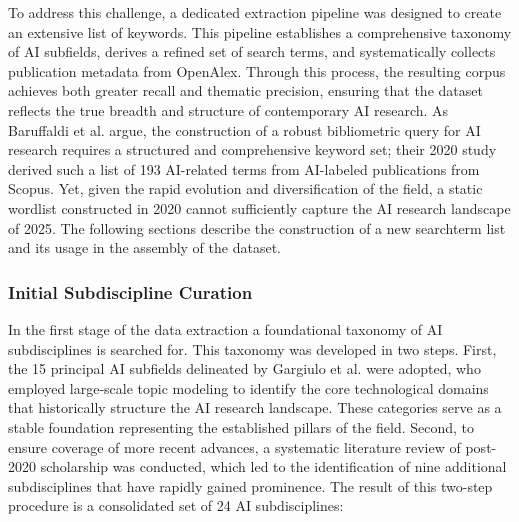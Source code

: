\documentclass{article}
\begin{document}
To address this challenge, a dedicated extraction pipeline was designed to create an extensive list of keywords. This pipeline establishes a comprehensive taxonomy of AI subfields, derives a refined set of search terms, and systematically collects publication metadata from OpenAlex. Through this process, the resulting corpus achieves both greater recall and thematic precision, ensuring that the dataset reflects the true breadth and structure of contemporary AI research. As Baruffaldi et al. argue, the construction of a robust bibliometric query for AI research requires a structured and comprehensive keyword set; their 2020 study derived such a list of 193 AI-related terms from AI-labeled publications from Scopus. \cite{baruffaldi2020identifying} Yet, given the rapid evolution and diversification of the field, a static wordlist constructed in 2020 cannot sufficiently capture the AI research landscape of 2025. The following sections describe the construction of a new searchterm list and its usage in the assembly of the dataset.


\subsubsection{Initial Subdiscipline Curation}

In the first stage of the data extraction a foundational taxonomy of AI subdisciplines is searched for. This taxonomy was developed in two steps. First, the 15 principal AI subfields delineated by Gargiulo et al. were adopted, who employed large-scale topic modeling to identify the core technological domains that historically structure the AI research landscape. \cite{gargiulo2022cartography} These categories serve as a stable foundation representing the established pillars of the field. Second, to ensure coverage of more recent advances, a systematic literature review of post-2020 scholarship was conducted, which led to the identification of nine additional subdisciplines that have rapidly gained prominence. The result of this two-step procedure is a consolidated set of 24 AI subdisciplines:
\end{document}
